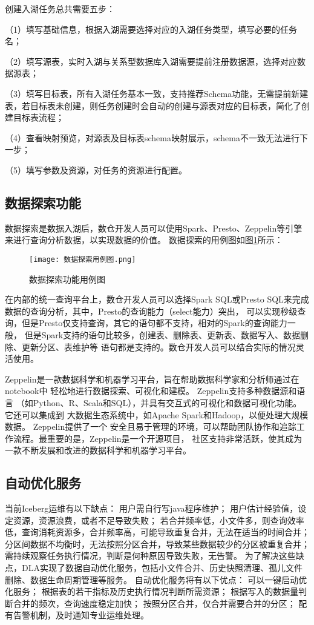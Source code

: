 创建入湖任务总共需要五步：

（1）填写基础信息，根据入湖需要选择对应的入湖任务类型，填写必要的任务名；

（2）填写源表，实时入湖与关系型数据库入湖需要提前注册数据源，选择对应数据源表；

（3）填写目标表，所有入湖任务基本一致，支持推荐Schema功能，无需提前新建表，若目标表未创建，则任务创建时会自动的创建与源表对应的目标表，简化了创建目标表流程；

（4）查看映射预览，对源表及目标表schema映射展示，schema不一致无法进行下一步；

（5）填写参数及资源，对任务的资源进行配置。

\subsection{数据探索功能}

数据探索是数据入湖后，数仓开发人员可以使用Spark、Presto、Zeppelin等引擎来进行查询分析数据，以实现数据的价值。
数据探索的用例图如图\ref{fig:数据探索用例图}所示：

\begin{figure}[H]
  \centering
  \texttt{[image: 数据探索用例图.png]}
  \caption{数据探索功能用例图}
  \label{fig:数据探索用例图}
\end{figure}

在内部的统一查询平台上，数仓开发人员可以选择Spark SQL或Presto SQL来完成数据的查询分析，其中，Presto的查询能力（select能力）突出，
可以实现秒级查询，但是Presto仅支持查询，其它的语句都不支持，相对的Spark的查询能力一般，
但是Spark支持的语句比较多，创建表、删除表、更新表、数据写入、数据删除、更新分区、表维护等
语句都是支持的。数仓开发人员可以结合实际的情况灵活使用。

Zeppelin是一款数据科学和机器学习平台，旨在帮助数据科学家和分析师通过在notebook中
轻松地进行数据探索、可视化和建模。 Zeppelin支持多种数据源和语言
（如Python、R、Scala和SQL），并具有交互式的可视化和数据可视化功能。它还可以集成到
大数据生态系统中，如Apache Spark和Hadoop，以便处理大规模数据。 Zeppelin提供了一个
安全且易于管理的环境，可以帮助团队协作和追踪工作流程。最重要的是，Zeppelin是一个开源项目，
社区支持非常活跃，使其成为一款不断发展和改进的数据科学和机器学习平台\cite{34}。

\subsection{自动优化服务}

当前Iceberg运维有以下缺点：
用户需自行写java程序维护；
用户估计经验值，设定资源，资源浪费，或者不足导致失败；
若合并频率低，小文件多，则查询效率低，查询消耗资源多，合并频率高，可能导致重复合并，无法在适当的时间合并；
分区间数据不均衡时，无法按照分区合并，导致某些数据较少的分区被重复合并；
需持续观察任务执行情况，判断是何种原因导致失败，无告警。
为了解决这些缺点，DLA实现了数据自动优化服务，包括小文件合并、历史快照清理、孤儿文件删除、数据生命周期管理等服务。
自动优化服务将有以下优点：
可以一键启动优化服务；
根据表的若干指标及历史执行情况判断所需资源；
根据写入的数据量判断合并的频次，查询速度稳定加快；
按照分区合并，仅合并需要合并的分区；
配有告警机制，及时通知专业运维处理。

